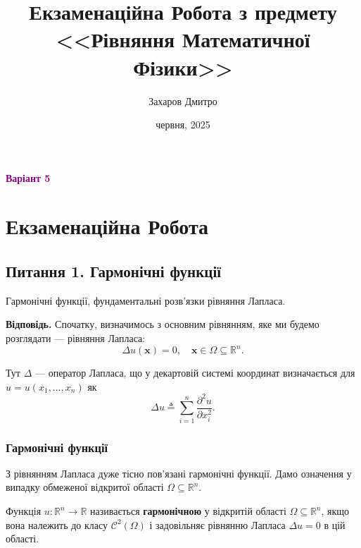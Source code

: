 \documentclass{exam_template}
\title{\huge\sffamily\bfseries Екзаменаційна Робота з предмету <<Рівняння Математичної Фізики>>}
\author{\Large\sffamily Захаров Дмитро}
\date{\sffamily 7 червня, 2025}
\begin{document}
\pagestyle{fancy}

\maketitle

\begin{center}
    \textcolor{purple}{\textbf{Варіант 5}}
\end{center}

\tableofcontents

\pagebreak

\section{Екзаменаційна Робота}

\subsection{Питання 1. Гармонічні функції}

\begin{problem}
    Гармонічні функції, фундаментальні розв'язки рівняння Лапласа.
\end{problem}

\textbf{Відповідь.} Спочатку, визначимось з основним рівнянням, 
яке ми будемо розглядати --- рівняння Лапласа:
\begin{equation*}
    \Delta u(\mathbf{x}) = 0, \quad \mathbf{x} \in \Omega \subseteq \mathbb{R}^n.
\end{equation*}

Тут $\Delta$ --- оператор Лапласа, що у декартовій системі координат 
визначається для $u=u(x_1,\dots,x_n)$ як
\begin{equation*}
    \Delta u \triangleq \sum_{i=1}^n \frac{\partial^2 u}{\partial x_i^2}.
\end{equation*}

\subsubsection{Гармонічні функції}
З рівнянням Лапласа дуже тісно пов'язані гармонічні функції. Дамо 
означення у випадку обмеженої відкритої області $\Omega \subseteq \mathbb{R}^n$.

\begin{definition}
    Функція $u: \mathbb{R}^n \to \mathbb{R}$ називається \textbf{гармонічною} у
    відкритій області $\Omega \subseteq \mathbb{R}^n$, якщо вона належить до
    класу $\mathcal{C}^2(\Omega)$ і задовільняє рівнянню Лапласа $\Delta u = 0$
    в цій області. 
\end{definition}
\end{document}
